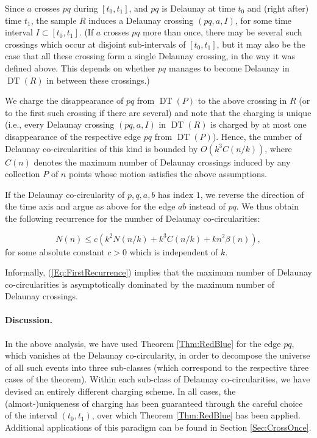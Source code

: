 \documentclass[letter,11pt]{article}
\def\DT{\mathop{\mathrm{DT}}}
\begin{document}
Since $a$ crosses $pq$ during $[t_0,t_1]$, and $pq$ is Delaunay at time $t_0$ and (right after) time $t_1$, the sample $R$ induces a Delaunay crossing $(pq,a,I)$, for some time interval $I\subset [t_0,t_1]$. (If $a$ crosses $pq$ more than once, there may be several such crossings which occur at disjoint  sub-intervals of $[t_0,t_1]$, but it may also be the case that all these crossing form a single Delaunay crossing, in the way it was defined above. This depends on whether $pq$ manages to become Delaunay in $\DT(R)$ in between these crossings.)

We charge the disappearance of $pq$ from $\DT(P)$ to the above crossing in $R$ (or to the first such crossing if there are several) and note that the charging is unique (i.e., every Delaunay crossing $(pq,a,I)$ in $\DT(R)$ is charged by at most one disappearance of the respective edge $pq$ from $\DT(P)$).
Hence, the number of Delaunay co-circularities of this kind is bounded by $O(k^3 C(n/k))$, where $C(n)$ denotes the maximum number of Delaunay crossings induced by any collection $P$ of $n$ points whose motion satisfies the above assumptions.


If the Delaunay co-circularity of $p,q,a,b$ has index $1$, we reverse the direction of the time axis and argue as above for the edge $ab$ instead of $pq$. We thus obtain the following recurrence for the number of Delaunay co-circularities:

\begin{equation}\label{Eq:FirstRecurrence}
N(n)\leq c\left(k^2N(n/k)+k^3C(n/k)+kn^2\beta(n)\right),
\end{equation}
for some absolute constant $c>0$ which is independent of $k$.

Informally, (\ref{Eq:FirstRecurrence}) implies that the maximum number of Delaunay co-circularities is asymptotically dominated by the maximum number of Delaunay crossings.

\paragraph{Discussion.} In the above analysis, we have used Theorem \ref{Thm:RedBlue} for the edge $pq$, which vanishes at the Delaunay co-circularity, in order to decompose the universe of all such events into three sub-classes (which correspond to the respective three cases of the theorem). Within each sub-class of Delaunay co-circularities, we have devised an entirely different charging scheme. In all cases, the (almost-)uniqueness of charging has been guaranteed through the careful choice of the interval $(t_0,t_1)$, over which Theorem \ref{Thm:RedBlue} has been applied. Additional applications of this paradigm can be found in Section \ref{Sec:CrossOnce}.
\end{document}
